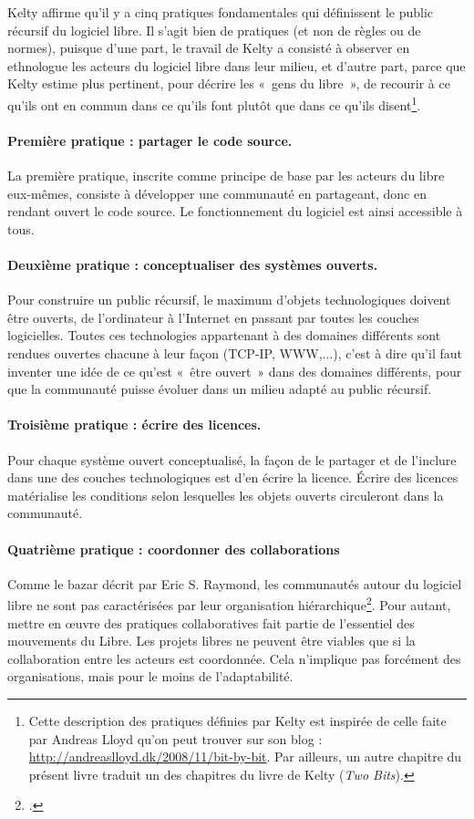 \documentclass{FramateX}
\begin{document}
\begin{refsection}
Kelty affirme qu'il y a cinq pratiques fondamentales
qui définissent le public récursif du logiciel libre. Il
s'agit bien de pratiques (et non de règles ou de
normes), puisque d'une part, le travail de Kelty a
consisté à observer en ethnologue les acteurs du logiciel libre dans
leur milieu, et d'autre part, parce que Kelty estime
plus pertinent, pour décrire les «~gens du libre~», de recourir à ce
qu'ils ont en commun dans ce qu'ils
font plutôt que dans ce qu'ils disent\footnote{Cette
description des pratiques définies par Kelty est inspirée de celle faite
par Andreas Lloyd qu'on peut trouver sur son blog :
\url{http://andreaslloyd.dk/2008/11/bit-by-bit}. Par ailleurs,
un autre chapitre du présent livre traduit un des chapitres du livre de
Kelty (\textit{Two Bits}).}.

\paragraph{Première pratique : partager le code source.} La première pratique, inscrite comme principe de base par les acteurs du libre eux-mêmes, consiste à développer une communauté en partageant, donc en rendant ouvert le code source. Le fonctionnement du logiciel est ainsi accessible à tous.

\paragraph{Deuxième pratique : conceptualiser des systèmes ouverts.} Pour construire un public récursif, le maximum d'objets
technologiques doivent être ouverts, de l'ordinateur à
l'Internet en passant par toutes les couches
logicielles. Toutes ces technologies appartenant à des domaines
différents sont rendues ouvertes chacune à leur façon (TCP-IP,
WWW,...), c'est à dire qu'il faut
inventer une idée de ce qu'est «~être ouvert~» dans
des domaines différents, pour que la communauté puisse évoluer dans un
milieu adapté au public récursif.

\paragraph{Troisième pratique : écrire des licences.} Pour chaque système ouvert conceptualisé, la façon de le partager et de
l'inclure dans une des couches technologiques est
d'en écrire la licence. Écrire des licences
matérialise les conditions selon lesquelles les objets ouverts
circuleront dans la communauté.

\paragraph{Quatrième pratique : coordonner des collaborations}
Comme le bazar décrit par Eric S. Raymond, les communautés autour du
logiciel libre ne sont pas caractérisées par leur organisation
hiérarchique\footnote{\cite{raymondcathedral2001}.}. Pour
autant, mettre en œuvre des pratiques collaboratives fait partie de
l'essentiel des mouvements du Libre. Les projets
libres ne peuvent être viables que si la collaboration entre les
acteurs est coordonnée. Cela n'implique pas forcément
des organisations, mais pour le moins de
l'adaptabilité.


\end{refsection}
\end{document}
